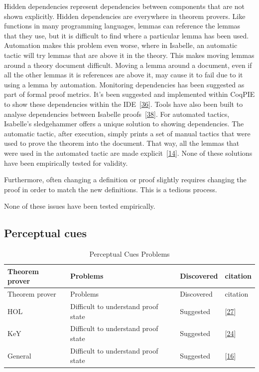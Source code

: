 \documentclass[
]{article}
\begin{document}
Hidden dependencies represent dependencies between components that are
not shown explicitly. Hidden dependencies are everywhere in theorem
provers. Like functions in many programming languages, lemmas can
reference the lemmas that they use, but it is difficult to find where a
particular lemma has been used. Automation makes this problem even
worse, where in Isabelle, an automatic tactic will try lemmas that are
above it in the theory. This makes moving lemmas around a theory
document difficult. Moving a lemma around a document, even if all the
other lemmas it is references are above it, may cause it to fail due to
it using a lemma by automation. Monitoring dependencies has been
suggested as part of formal proof metrics. It's been suggested and
implemented within CoqPIE to show these dependencies within the
IDE~{[}\protect\hyperlink{ref-roe_coqpie_2016}{36}{]}. Tools have also
been built to analyse dependencies between Isabelle
proofs~{[}\protect\hyperlink{ref-spichkova_human-centred_2017}{38}{]}.
For automated tactics, Isabelle's sledgehammer offers a unique solution
to showing dependencies. The automatic tactic, after execution, simply
prints a set of manual tactics that were used to prove the theorem into
the document. That way, all the lemmas that were used in the automated
tactic are made
explicit~{[}\protect\hyperlink{ref-bourke_challenges_2012}{14}{]}. None
of these solutions have been empirically tested for validity.

Furthermore, often changing a definition or proof slightly requires
changing the proof in order to match the new definitions. This is a
tedious process.

None of these issues have been tested empirically.

\hypertarget{perceptual-cues-1}{%
\subsection{Perceptual cues}\label{perceptual-cues-1}}

\hypertarget{tbl:perceptual_cues}{}
\begin{longtable}[]{@{}llll@{}}
\caption{\label{tbl:perceptual_cues}Perceptual Cues
Problems}\tabularnewline
\toprule
Theorem prover & Problems & Discovered & citation \\
\midrule
\endfirsthead
\toprule
Theorem prover & Problems & Discovered & citation \\
\midrule
\endhead
HOL & Difficult to understand proof state & Suggested &
{[}\protect\hyperlink{ref-kadoda_cognitive_2000}{27}{]} \\
KeY & Difficult to understand proof state & Suggested &
{[}\protect\hyperlink{ref-hentschel_integrating_2016}{24}{]} \\
General & Difficult to understand proof state & Suggested &
{[}\protect\hyperlink{ref-eastaughffe_support_1998}{16}{]} \\
\bottomrule
\end{longtable}
\end{document}
